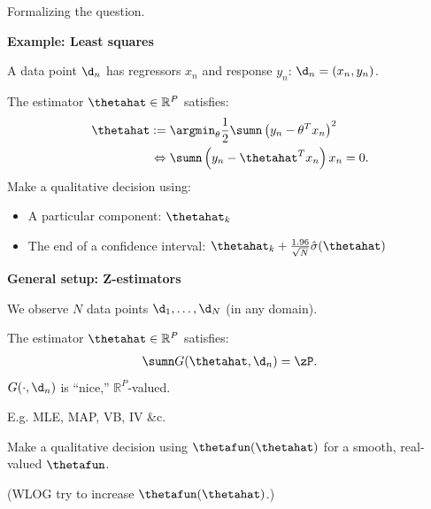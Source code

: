 

\begin{frame}[t]{Formalizing the question.}

\begin{minipage}[t]{0.45\textwidth}
\textbf{Example: Least squares}

\pause
\vspace{1em}
A data point $\d_n$ has regressors
$x_n$ and response $y_n$: $\d_n = (x_n, y_n)$.

\pause
\vspace{1em}
The estimator $\thetahat \in \mathbb{R}^P$ satisfies:
%
\begin{align*}
%
\thetahat :={}&
    \argmin_{\theta} \frac{1}{2} \sumn \left(y_n - \theta^T x_n \right)^{2} \\
\Leftrightarrow{}& \sumn \left(y_n - \thetahat^T x_n \right) x_n = 0.
%
\end{align*}
%
\pause
Make a qualitative decision using:\vspace{-1.5em}
\begin{itemize}
\item A particular component: $\thetahat_k$
\item The end of a confidence interval:
    $\thetahat_k + \frac{1.96}{\sqrt{N}} \hat\sigma(\thetahat)$
\end{itemize}
%
\end{minipage}
%
\pause
\hfill\vline\hfill
%
\begin{minipage}[t]{0.45\textwidth}
\textbf{General setup: Z-estimators}

\pause
\vspace{1em}
We observe $N$ data points $\d_{1}, \ldots, \d_{N}$
(in any domain).

\pause
\vspace{1em}
The estimator $\thetahat \in \mathbb{R}^P$ satisfies:
%
\begin{align*}
%
\sumn
G(\thetahat, \d_{n}) =  \zP.
%
\end{align*}
%
$G(\cdot, \d_{n})$ is ``nice,'' $\mathbb{R}^P$-valued.

E.g. MLE, MAP, VB, IV \&c.

\pause
\vspace{1em}
Make a qualitative decision using $\thetafun(\thetahat)$
for a smooth, real-valued $\thetafun$.

\vspace{1em}
(WLOG try to increase $\thetafun(\thetahat)$.)
%
\end{minipage}

\end{frame}






